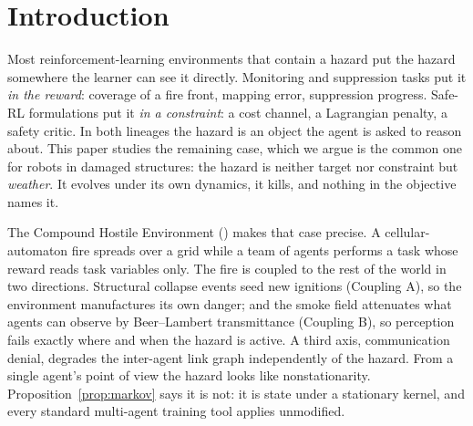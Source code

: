 \section{Introduction}
\label{sec:intro}

Most reinforcement-learning environments that contain a hazard put the hazard
somewhere the learner can see it directly. Monitoring and suppression tasks
put it \emph{in the reward}: coverage of a fire front, mapping error,
suppression progress. Safe-RL formulations put it \emph{in a constraint}: a
cost channel, a Lagrangian penalty, a safety critic. In both lineages the
hazard is an object the agent is asked to reason about. This paper studies
the remaining case, which we argue is the common one for robots in damaged
structures: the hazard is neither target nor constraint but \emph{weather}. It
evolves under its own dynamics, it kills, and nothing in the objective names
it.

The Compound Hostile Environment (\CHE) makes that case precise. A
cellular-automaton fire spreads over a grid while a team of agents performs a
task whose reward reads task variables only. The fire is coupled to the rest
of the world in two directions. Structural collapse events seed new ignitions
(Coupling A), so the environment manufactures its own danger; and the smoke
field attenuates what agents can observe by Beer--Lambert transmittance
(Coupling B), so perception fails exactly where and when the hazard is
active. A third axis, communication denial, degrades the inter-agent link
graph independently of the hazard. From a single agent's point of view the
hazard looks like nonstationarity. Proposition~\ref{prop:markov} says it is
not: it is state under a stationary kernel, and every standard multi-agent
training tool applies unmodified.

